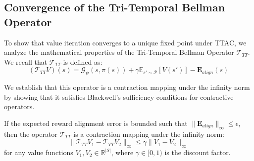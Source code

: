 \documentclass[manuscript, screen, review]{jair}
\begin{document}
\subsection{Convergence of the Tri-Temporal Bellman Operator}
To show that value iteration converges to a unique fixed point under TTAC, we analyze the mathematical properties of the Tri-Temporal Bellman Operator $\mathcal{T}_{TT}$. We recall that $\mathcal{T}_{TT}$ is defined as:
\begin{equation}
    \left( \mathcal{T}_{TT} V \right)(s) = \mathcal{G}_\psi(s, \pi(s)) + \gamma \mathbb{E}_{s' \sim \mathcal{P}} \left[ V(s') \right] - \mathbf{E}_{align}(s)
\end{equation}

We establish that this operator is a contraction mapping under the infinity norm by showing that it satisfies Blackwell's sufficiency conditions for contractive operators.

\begin{lemma}
If the expected reward alignment error is bounded such that $\|\mathbf{E}_{align}\|_\infty \le \epsilon$, then the operator $\mathcal{T}_{TT}$ is a contraction mapping under the infinity norm:
\begin{equation}
    \| \mathcal{T}_{TT} V_1 - \mathcal{T}_{TT} V_2 \|_\infty \le \gamma \| V_1 - V_2 \|_\infty
\end{equation}
for any value functions $V_1, V_2 \in \mathbb{R}^{|\mathcal{S}|}$, where $\gamma \in [0, 1)$ is the discount factor.
\end{lemma}
\end{document}
